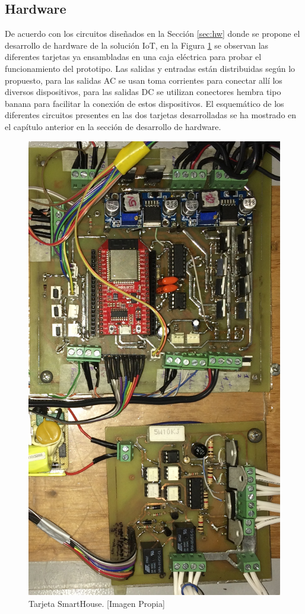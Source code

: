 \subsection{Hardware}

De acuerdo con los circuitos diseñados en la Sección \ref{sec:hw} donde se propone el desarrollo de hardware de la solución IoT, en la Figura \ref{fig:tarjeta} se observan las diferentes tarjetas ya ensambladas en una caja eléctrica para probar el funcionamiento del prototipo. Las salidas y entradas están distribuidas según lo propuesto, para las salidas AC se usan toma corrientes para conectar allí los diversos dispositivos, para las salidas DC se utilizan conectores hembra tipo banana para facilitar la conexión de estos dispositivos. El esquemático de los diferentes circuitos presentes en las dos tarjetas desarrolladas se ha mostrado en el capítulo anterior en la sección de desarrollo de hardware.\\

\begin{figure}[!t]
	\centering
	\caption[Tarjeta SmartHouse.]{Tarjeta SmartHouse. [Imagen Propia]}
	\label{fig:tarjeta}
	\includegraphics[width=0.6\linewidth]{Imagenes/Tarjeta.jpg}
\end{figure}

